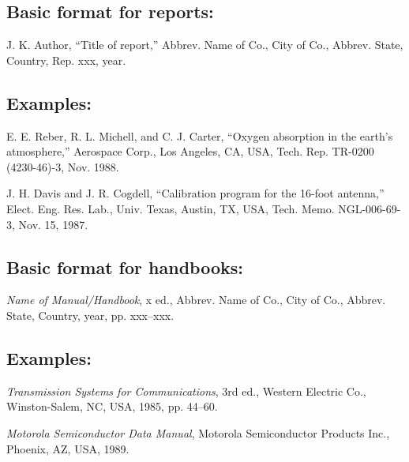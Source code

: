 \documentclass[journal]{IEEEtai}
\begin{document}
\subsection*{Basic format for reports:}\vspace*{-12pt}
\begin{thebibliography}{34}
\item[]
J. K. Author, ``Title of report,'' Abbrev. Name of Co., City of Co., Abbrev. State, Country, Rep. xxx, year.
\end{thebibliography}

\subsection*{Examples:}\vspace*{-12pt}
\begin{thebibliography}{34}
\setcounter{enumiv}{5}

\bibitem{} E. E. Reber, R. L. Michell, and C. J. Carter, ``Oxygen absorption in the earth’s atmosphere,'' Aerospace Corp., Los Angeles, CA, USA, Tech. Rep. TR-0200 (4230-46)-3, Nov. 1988.

\bibitem{} J. H. Davis and J. R. Cogdell, ``Calibration program for the 16-foot antenna,'' Elect. Eng. Res. Lab., Univ. Texas, Austin, TX, USA, Tech. Memo. NGL-006-69-3, Nov. 15, 1987.
\end{thebibliography}

\subsection*{Basic format for handbooks:}\vspace*{-12pt}
\begin{thebibliography}{34}
\item[]
{\em Name of Manual/Handbook}, x ed., Abbrev. Name of Co., City of Co., Abbrev. State, Country, year, pp. xxx--xxx.
\end{thebibliography}

\subsection*{Examples:}\vspace*{-12pt}

\begin{thebibliography}{34}
\setcounter{enumiv}{7}

\bibitem{} {\em Transmission Systems for Communications}, 3rd ed., Western Electric Co., Winston-Salem, NC, USA, 1985, pp. 44--60.

\bibitem{} {\em Motorola Semiconductor Data Manual}, Motorola Semiconductor Products Inc., Phoenix, AZ, USA, 1989.
\end{thebibliography}
\end{document}
